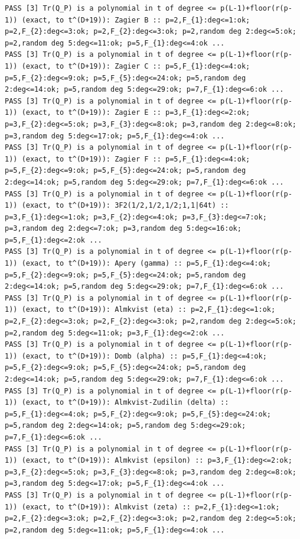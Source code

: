 \documentclass[11pt,a4paper]{article}
\theoremstyle{definition}\newtheorem{definition}[theorem]{Definition}
\theoremstyle{remark}\newtheorem{remark}[theorem]{Remark}
\numberwithin{equation}{section}
\begin{document}
\begin{lstlisting}
PASS [3] Tr(Q_P) is a polynomial in t of degree <= p(L-1)+floor(r(p-1)) (exact, to t^(D+19)): Zagier B :: p=2,F_{1}:deg<=1:ok; p=2,F_{2}:deg<=3:ok; p=2,F_{2}:deg<=3:ok; p=2,random deg 2:deg<=5:ok; p=2,random deg 5:deg<=11:ok; p=5,F_{1}:deg<=4:ok ...
PASS [3] Tr(Q_P) is a polynomial in t of degree <= p(L-1)+floor(r(p-1)) (exact, to t^(D+19)): Zagier C :: p=5,F_{1}:deg<=4:ok; p=5,F_{2}:deg<=9:ok; p=5,F_{5}:deg<=24:ok; p=5,random deg 2:deg<=14:ok; p=5,random deg 5:deg<=29:ok; p=7,F_{1}:deg<=6:ok ...
PASS [3] Tr(Q_P) is a polynomial in t of degree <= p(L-1)+floor(r(p-1)) (exact, to t^(D+19)): Zagier E :: p=3,F_{1}:deg<=2:ok; p=3,F_{2}:deg<=5:ok; p=3,F_{3}:deg<=8:ok; p=3,random deg 2:deg<=8:ok; p=3,random deg 5:deg<=17:ok; p=5,F_{1}:deg<=4:ok ...
PASS [3] Tr(Q_P) is a polynomial in t of degree <= p(L-1)+floor(r(p-1)) (exact, to t^(D+19)): Zagier F :: p=5,F_{1}:deg<=4:ok; p=5,F_{2}:deg<=9:ok; p=5,F_{5}:deg<=24:ok; p=5,random deg 2:deg<=14:ok; p=5,random deg 5:deg<=29:ok; p=7,F_{1}:deg<=6:ok ...
PASS [3] Tr(Q_P) is a polynomial in t of degree <= p(L-1)+floor(r(p-1)) (exact, to t^(D+19)): 3F2(1/2,1/2,1/2;1,1|64t) :: p=3,F_{1}:deg<=1:ok; p=3,F_{2}:deg<=4:ok; p=3,F_{3}:deg<=7:ok; p=3,random deg 2:deg<=7:ok; p=3,random deg 5:deg<=16:ok; p=5,F_{1}:deg<=2:ok ...
PASS [3] Tr(Q_P) is a polynomial in t of degree <= p(L-1)+floor(r(p-1)) (exact, to t^(D+19)): Apery (gamma) :: p=5,F_{1}:deg<=4:ok; p=5,F_{2}:deg<=9:ok; p=5,F_{5}:deg<=24:ok; p=5,random deg 2:deg<=14:ok; p=5,random deg 5:deg<=29:ok; p=7,F_{1}:deg<=6:ok ...
PASS [3] Tr(Q_P) is a polynomial in t of degree <= p(L-1)+floor(r(p-1)) (exact, to t^(D+19)): Almkvist (eta) :: p=2,F_{1}:deg<=1:ok; p=2,F_{2}:deg<=3:ok; p=2,F_{2}:deg<=3:ok; p=2,random deg 2:deg<=5:ok; p=2,random deg 5:deg<=11:ok; p=3,F_{1}:deg<=2:ok ...
PASS [3] Tr(Q_P) is a polynomial in t of degree <= p(L-1)+floor(r(p-1)) (exact, to t^(D+19)): Domb (alpha) :: p=5,F_{1}:deg<=4:ok; p=5,F_{2}:deg<=9:ok; p=5,F_{5}:deg<=24:ok; p=5,random deg 2:deg<=14:ok; p=5,random deg 5:deg<=29:ok; p=7,F_{1}:deg<=6:ok ...
PASS [3] Tr(Q_P) is a polynomial in t of degree <= p(L-1)+floor(r(p-1)) (exact, to t^(D+19)): Almkvist-Zudilin (delta) :: p=5,F_{1}:deg<=4:ok; p=5,F_{2}:deg<=9:ok; p=5,F_{5}:deg<=24:ok; p=5,random deg 2:deg<=14:ok; p=5,random deg 5:deg<=29:ok; p=7,F_{1}:deg<=6:ok ...
PASS [3] Tr(Q_P) is a polynomial in t of degree <= p(L-1)+floor(r(p-1)) (exact, to t^(D+19)): Almkvist (epsilon) :: p=3,F_{1}:deg<=2:ok; p=3,F_{2}:deg<=5:ok; p=3,F_{3}:deg<=8:ok; p=3,random deg 2:deg<=8:ok; p=3,random deg 5:deg<=17:ok; p=5,F_{1}:deg<=4:ok ...
PASS [3] Tr(Q_P) is a polynomial in t of degree <= p(L-1)+floor(r(p-1)) (exact, to t^(D+19)): Almkvist (zeta) :: p=2,F_{1}:deg<=1:ok; p=2,F_{2}:deg<=3:ok; p=2,F_{2}:deg<=3:ok; p=2,random deg 2:deg<=5:ok; p=2,random deg 5:deg<=11:ok; p=5,F_{1}:deg<=4:ok ...

\end{lstlisting}
\end{document}
